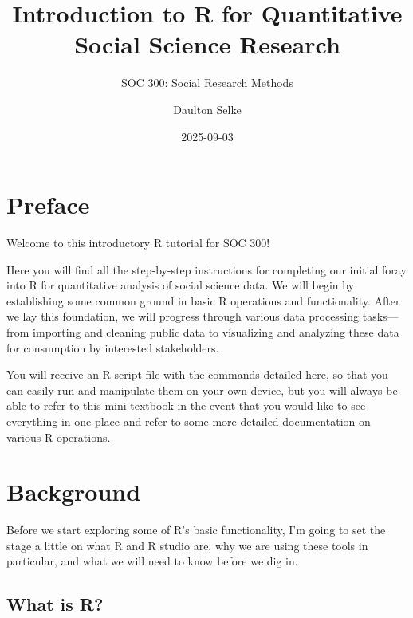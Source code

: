 \documentclass[
  letterpaper,
  DIV=11,
  numbers=noendperiod]{scrreprt}
\title{Introduction to R for Quantitative Social Science Research}
\subtitle{SOC 300: Social Research Methods}
\author{Daulton Selke}
\date{2025-09-03}
\renewcommand*\contentsname{Table of contents}
\newcommand\contentsname{Table of contents}
\begin{document}
\maketitle

\renewcommand*\contentsname{Table of contents}
{
\hypersetup{linkcolor=}
\setcounter{tocdepth}{2}
\tableofcontents
}


\chapter*{Preface}\label{preface}


Welcome to this introductory R tutorial for SOC 300!

Here you will find all the step-by-step instructions for completing our
initial foray into R for quantitative analysis of social science data.
We will begin by establishing some common ground in basic R operations
and functionality. After we lay this foundation, we will progress
through various data processing tasks---from importing and cleaning
public data to visualizing and analyzing these data for consumption by
interested stakeholders.

You will receive an R script file with the commands detailed here, so
that you can easily run and manipulate them on your own device, but you
will always be able to refer to this mini-textbook in the event that you
would like to see everything in one place and refer to some more
detailed documentation on various R operations.


\chapter*{Background}\label{background}


Before we start exploring some of R's basic functionality, I'm going to
set the stage a little on what R and R studio are, why we are using
these tools in particular, and what we will need to know before we dig
in.

\section*{What is R?}\label{what-is-r}
\end{document}
